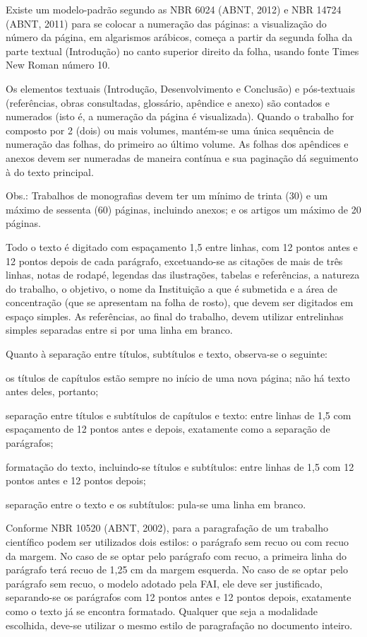 \documentclass[a4paper,12pt]{article}  %
\begin{document}
\begin{ElementosTextuais}
\begin{Desenvolvimento}
Existe um modelo-padrão segundo as NBR 6024 (ABNT, 2012) e NBR 14724 (ABNT, 2011) para se colocar a numeração das páginas: a visualização do número da página, em algarismos arábicos, começa a partir da segunda folha da parte textual (Introdução) no canto superior direito da folha, usando fonte Times New Roman número 10.

Os elementos textuais (Introdução, Desenvolvimento e Conclusão) e pós-textuais (referências, obras consultadas, glossário, apêndice e anexo) são contados e numerados (isto é, a numeração da página é visualizada). Quando o trabalho for composto por 2 (dois) ou mais volumes, mantém-se uma única sequência de numeração das folhas, do primeiro ao último volume. As folhas dos apêndices e anexos devem ser numeradas de maneira contínua e sua paginação dá seguimento à do texto principal.

Obs.: Trabalhos de monografias devem ter um mínimo de trinta (30) e um máximo de sessenta (60) páginas, incluindo anexos; e os artigos um máximo de 20 páginas.

Todo o texto é digitado com espaçamento 1,5 entre linhas, com 12 pontos antes e 12 pontos depois de cada parágrafo, excetuando-se as citações de mais de três linhas, notas de rodapé, legendas das ilustrações, tabelas e referências, a natureza do trabalho, o objetivo, o nome da Instituição a que é submetida e a área de concentração (que se apresentam na folha de rosto), que devem ser digitados em espaço simples. As referências, ao final do trabalho, devem utilizar entrelinhas simples separadas entre si por uma linha em branco.

Quanto à separação entre títulos, subtítulos e texto, observa-se o seguinte:

\begin{alphaitemize}
  \item os títulos de capítulos estão sempre no início de uma nova página; não há texto antes deles, portanto;
  \item separação entre títulos e subtítulos de capítulos e texto: entre linhas de 1,5 com espaçamento de 12 pontos antes e depois, exatamente como a separação de parágrafos;
  \item formatação do texto, incluindo-se títulos e subtítulos: entre linhas de 1,5 com 12 pontos antes e 12 pontos depois;
  \item separação entre o texto e os subtítulos: pula-se uma linha em branco.
\end{alphaitemize}

Conforme NBR 10520 (ABNT, 2002), para a paragrafação de um trabalho científico podem ser utilizados dois estilos: o parágrafo sem recuo ou com recuo da margem. No caso de se optar pelo parágrafo com recuo, a primeira linha do parágrafo terá recuo de 1,25 cm da margem esquerda. No caso de se optar pelo parágrafo sem recuo, o modelo adotado pela FAI, ele deve ser justificado, separando-se os parágrafos com 12 pontos antes e 12 pontos depois, exatamente como o texto já se encontra formatado. Qualquer que seja a modalidade escolhida, deve-se utilizar o mesmo estilo de paragrafação no documento inteiro.


\end{Desenvolvimento}
\end{ElementosTextuais}
\end{document}
